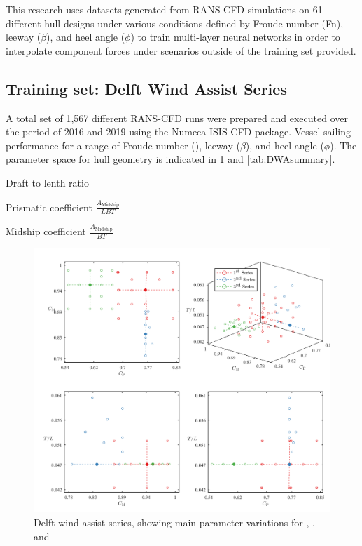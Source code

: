 \documentclass[twoside,twocolumn]{article}
\begin{document}
	This research uses datasets generated from RANS-CFD simulations on 61 different hull designs under various conditions defined by Froude number (Fn), leeway ($\beta$), and heel angle ($\phi$) to train multi-layer neural networks in order to interpolate component forces under scenarios outside of the training set provided. 
	
	
	\subsection{Training set: Delft Wind Assist Series}
	
	A total set of 1,567 different RANS-CFD runs were prepared and executed over the period of 2016 and 2019 using the Numeca ISIS-CFD package. Vessel sailing performance for a range of Froude number (\Fn), leeway ($\beta$), and heel angle ($\phi$). The parameter space for hull geometry is indicated in \cref{fig:DWA} and \cref{tab:DWAsummary}.
	
	\begin{description}[leftmargin=1cm]
		
		\item[\TL]{Draft to lenth ratio}
		\item[\Cp]{Prismatic coefficient $\frac{A_{\mathrm{Midship}}}{LBT}$}
		\item[\Cm]{Midship coefficient $\frac{A_{\mathrm{Midship}}}{BT}$}
	\end{description}
	
	
	\begin{figure}[!ht]
		\centering
		\includegraphics[width=.9\textwidth]{images/DWAseries.png}  %
		\caption{Delft wind assist series, showing main parameter variations for \TL, \Cp, and \Cm}
		\label{fig:DWA}
	\end{figure}
	
\end{document}
